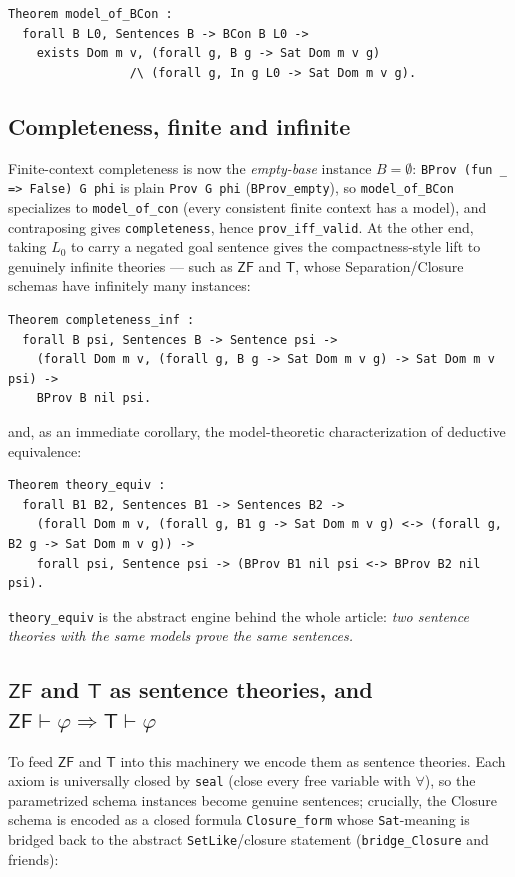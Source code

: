 \documentclass[11pt]{article}
\theoremstyle{plain}
\theoremstyle{definition}
\newcommand{\ZF}{\mathsf{ZF}}
\renewcommand{\ZF}{\textsf{ZF}}
\newcommand{\T}{\textsf{T}}
\newcommand{\proves}{\vdash}
\newcommand{\cq}[1]{\lstinline[basicstyle=\ttfamily]|#1|}
\begin{document}
\begin{lstlisting}
Theorem model_of_BCon :
  forall B L0, Sentences B -> BCon B L0 ->
    exists Dom m v, (forall g, B g -> Sat Dom m v g)
                 /\ (forall g, In g L0 -> Sat Dom m v g).
\end{lstlisting}

\subsection{Completeness, finite and infinite}

Finite-context completeness is now the \emph{empty-base} instance $B = \emptyset$:
\cq{BProv (fun _ => False) G phi} is plain \cq{Prov G phi} (\cq{BProv_empty}), so
\cq{model_of_BCon} specializes to \cq{model_of_con} (every consistent finite
context has a model), and contraposing gives \cq{completeness}, hence
\cq{prov_iff_valid}. At the other end, taking $L_0$ to carry a negated goal
sentence gives the compactness-style lift to genuinely infinite theories --- such
as $\ZF$ and $\T$, whose Separation/Closure schemas have infinitely many
instances:

\begin{lstlisting}
Theorem completeness_inf :
  forall B psi, Sentences B -> Sentence psi ->
    (forall Dom m v, (forall g, B g -> Sat Dom m v g) -> Sat Dom m v psi) ->
    BProv B nil psi.
\end{lstlisting}

and, as an immediate corollary, the model-theoretic characterization of deductive
equivalence:

\begin{lstlisting}
Theorem theory_equiv :
  forall B1 B2, Sentences B1 -> Sentences B2 ->
    (forall Dom m v, (forall g, B1 g -> Sat Dom m v g) <-> (forall g, B2 g -> Sat Dom m v g)) ->
    forall psi, Sentence psi -> (BProv B1 nil psi <-> BProv B2 nil psi).
\end{lstlisting}

\cq{theory_equiv} is the abstract engine behind the whole article:
\emph{two sentence theories with the same models prove the same sentences.}

\subsection{$\ZF$ and $\T$ as sentence theories, and $\ZF \proves \varphi \Rightarrow \T \proves \varphi$}

To feed $\ZF$ and $\T$ into this machinery we encode them as sentence theories.
Each axiom is universally closed by \cq{seal} (close every free variable with
$\forall$), so the parametrized schema instances become genuine sentences;
crucially, the Closure schema is encoded as a closed formula \cq{Closure_form}
whose \cq{Sat}-meaning is bridged back to the abstract \cq{SetLike}/closure
statement (\cq{bridge_Closure} and friends):
\end{document}
